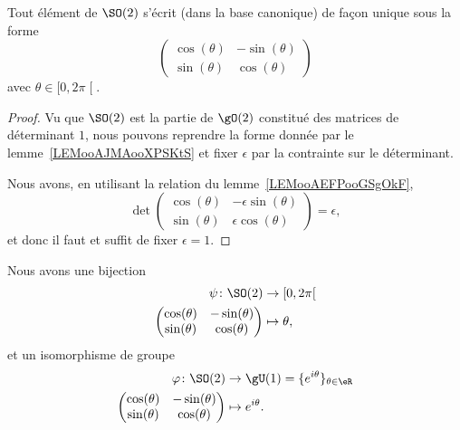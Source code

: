 \begin{lemma}       \label{LEMooHRESooQTrpMz}
    Tout élément de \( \SO(2)\) s'écrit (dans la base canonique) de façon unique sous la forme
    \begin{equation}
        \begin{pmatrix}
            \cos(\theta)    &   -\sin(\theta)    \\
            \sin(\theta)    &   \cos(\theta)
        \end{pmatrix}
    \end{equation}
    avec \( \theta\in\mathopen[ 0 , 2\pi \mathclose[\).
\end{lemma}

\begin{proof}
    Vu que \( \SO(2)\) est la partie de \( \gO(2)\) constitué des matrices de déterminant \( 1\), nous pouvons reprendre la forme donnée par le lemme~\ref{LEMooAJMAooXPSKtS} et fixer \( \epsilon\) par la contrainte sur le déterminant.

    Nous avons, en utilisant la relation du lemme~\ref{LEMooAEFPooGSgOkF},
    \begin{equation}
        \det\begin{pmatrix}
            \cos(\theta)    &   -\epsilon\sin(\theta)    \\
            \sin(\theta)    &   \epsilon\cos(\theta)
        \end{pmatrix}=\epsilon,
    \end{equation}
    et donc il faut et suffit de fixer \( \epsilon=1\).
\end{proof}



\begin{corollary}        \label{CORooGGVUooLQYGET}
    Nous avons une bijection
    \begin{equation}
        \begin{aligned}
            \psi\colon \SO(2)&\to \mathopen[ 0 , 2\pi \mathclose[ \\
        \begin{pmatrix}
            \cos(\theta)    &   -\sin(\theta)    \\
            \sin(\theta)    &   \cos(\theta)
        \end{pmatrix}
              &\mapsto \theta,
        \end{aligned}
    \end{equation}
    et un isomorphisme de groupe
    \begin{equation}
        \begin{aligned}
            \varphi\colon \SO(2)&\to \gU(1)=\{  e^{i\theta} \}_{\theta\in \eR} \\
        \begin{pmatrix}
            \cos(\theta)    &   -\sin(\theta)    \\
            \sin(\theta)    &   \cos(\theta)
        \end{pmatrix}
        &\mapsto  e^{i\theta}.
        \end{aligned}
    \end{equation}
\end{corollary}


